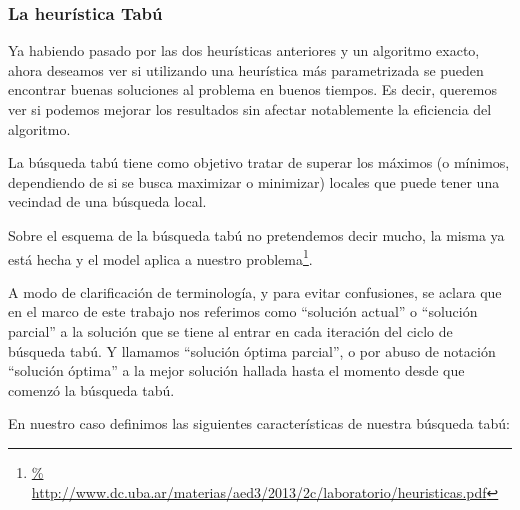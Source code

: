 \subsubsection{La heur\'istica Tab\'u}\label{tabu:explicacion}
\par Ya habiendo pasado por las dos heur\'isticas anteriores y un algoritmo exacto,
    ahora deseamos ver si utilizando una heur\'istica m\'as parametrizada
    se pueden encontrar buenas soluciones al problema en buenos tiempos. Es decir,
    queremos ver si podemos mejorar los resultados sin afectar notablemente la
    eficiencia del algoritmo.

\par La b\'usqueda tab\'u tiene como objetivo tratar de superar los m\'aximos
    (o m\'inimos, dependiendo de si se busca maximizar o minimizar) locales
    que puede tener una vecindad de una b\'usqueda local.

\par Sobre el esquema de la b\'usqueda tab\'u no pretendemos decir mucho, la misma
    ya est\'a hecha y el model aplica a nuestro problema\footnote{\url{%
    http://www.dc.uba.ar/materias/aed3/2013/2c/laboratorio/heuristicas.pdf}}.

\par A modo de clarificaci\'on de terminolog\'ia, y para evitar confusiones,
    se aclara que en el marco de este trabajo nos referimos como ``soluci\'on
    actual'' o ``soluci\'on parcial'' a la soluci\'on que se tiene al entrar
    en cada iteraci\'on del ciclo de b\'usqueda tab\'u. Y llamamos ``soluci\'on
    \'optima parcial'', o por abuso de notaci\'on ``soluci\'on \'optima'' a la
    mejor soluci\'on hallada hasta el momento desde que comenz\'o la b\'usqueda
    tab\'u.

\par En nuestro caso definimos las siguientes caracter\'isticas de nuestra
    b\'usqueda tab\'u:

